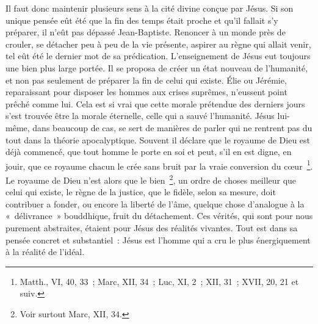 \documentclass[french,twoside]{book} %
\begin{document}
Il faut donc maintenir plusieurs sens à la cité divine conçue par Jésus. Si son unique pensée eût été que la fin des temps était proche et qu’il fallait s’y préparer, il n’eût pas dépassé Jean-Baptiste. Renoncer à un monde près de crouler, se détacher peu à peu de la vie présente, aspirer au règne qui allait venir, tel eût été le dernier mot de sa prédication. L’enseignement de Jésus eut toujours une bien plus large portée. Il se proposa de créer un état nouveau de l’humanité, et non pas seulement de préparer la fin de celui qui existe. Élie ou Jérémie, reparaissant pour disposer les hommes aux crises suprêmes, n’eussent point prêché comme lui. Cela est si vrai que cette morale prétendue des derniers jours s’est trouvée être la morale éternelle, celle qui a sauvé l’humanité. Jésus lui-même, dans beaucoup de cas, se sert de manières de parler qui ne rentrent pas du tout dans la théorie apocalyptique. Souvent il déclare que le royaume de Dieu est déjà commencé, que tout homme le porte en soi et peut, s’il en est digne, en jouir, que ce royaume chacun le crée sans bruit par la vraie conversion du cœur \footnote{Matth., VI, 40, 33 ; Marc, XII, 34 ; Luc, XI, 2 ; XII, 31 ; XVII, 20, 21 et suiv.}. Le royaume de Dieu n’est alors que le bien \footnote{Voir surtout Marc, XII, 34.}, un ordre de choses meilleur que celui qui existe, le règne de la justice, que le fidèle, selon sa mesure, doit contribuer a fonder, ou encore la liberté de l’âme, quelque chose d’analogue à la « délivrance » bouddhique, fruit du détachement. Ces vérités, qui sont pour nous purement abstraites, étaient pour Jésus des réalités vivantes. Tout est dans sa pensée concret et substantiel : Jésus est l’homme qui a cru le plus énergiquement à la réalité de l’idéal.\par
\end{document}
